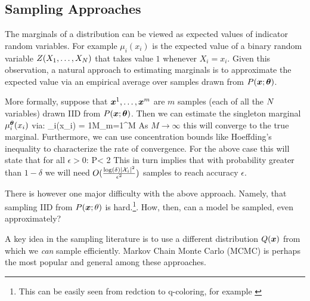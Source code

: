 \subsection{Sampling Approaches}
\label{sec:sampling}
The marginals of a distribution can be viewed as expected values of indicator random variables. For example $\mu_i(x_i)$ is the expected value of a binary
random variable $Z(X_1,\ldots,X_{N})$ that takes value $1$ whenever $X_i=x_i$. Given this observation, a natural approach to estimating marginals is to approximate the expected value via an empirical average over samples drawn from $P(\boldsymbol{x};\boldsymbol{\theta})$. 

More formally, suppose that $\boldsymbol{x}^{1},\ldots,\boldsymbol{x}^{m}$ are $m$ samples (each of all the $N$ variables) drawn IID from $P(\boldsymbol{x};\boldsymbol{\theta})$. Then we can estimate the singleton marginal $\mu^{\boldsymbol{\theta}}_i(x_i)$ via:
\be
\hat{\mu}_i(x_i) = {1\over M}{\sum_{m=1}^M }
\ee
As $M\to\infty$ this will converge to the true marginal. Furthermore, we can use concentration bounds like Hoeffding's inequality to characterize the rate of convergence. For the above case this will state that for all $\epsilon > 0$:
\be
P < 2
\ee
This in turn implies that with probability greater than $1-\delta$ we will need $O(\frac{\log(\delta) |{\cal X}_i|^2}{\epsilon^2})$ samples to reach accuracy $\epsilon$.

There is however one major difficulty with the above approach. Namely, that sampling IID from $P(\boldsymbol{x};\theta)$ is hard.\footnote{This can be easily seen from redction to q-coloring, for example \cite{levin2009markov, bordewich2016mixing}}. How, then, can a model be sampled, even approximately?

A key idea in the sampling literature is to use a different distribution $Q(\boldsymbol{x})$ from which we {\em can} sample efficiently. 
Markov Chain Monte Carlo (MCMC) is perhaps the most popular and general among these approaches\cite{andrieu2003introduction,levin2009markov}.

